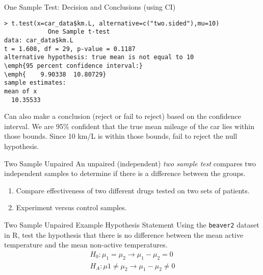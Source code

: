 \documentclass[xcolor=svgnames, 10pt, handout]{beamer}
\begin{document}
\begin{frame}[fragile]{One Sample Test: Decision and Conclusions (using CI)}\small
\begin{Verbatim}[xleftmargin=2em, xrightmargin=1.5em, frame=single, label=R code, framesep=0.5em, fontsize=\footnotesize, commandchars=\\\{\}]
> t.test(x=car_data$km.L, alternative=c("two.sided"),mu=10)
            One Sample t-test
data: car_data$km.L
t = 1.608, df = 29, p-value = 0.1187
alternative hypothesis: true mean is not equal to 10
\emph{95 percent confidence interval:}
\emph{    9.90338  10.80729}
sample estimates:
mean of x
  10.35533
\end{Verbatim}
Can also make a conclusion (reject or fail to reject) based on the confidence interval. We are 95\% confident that the true mean mileage of the car lies within those bounds. 
\vfill
Since 10 km/L is within those bounds, fail to reject the null hypothesis.
\vfill
\end{frame}


\begin{frame}[fragile]{Two Sample Unpaired}
\vfill
An unpaired (independent) \emph{two sample test} compares two independent samples to determine if there is a difference between the groups.
\vfill
\begin{example}
\begin{enumerate}
\item Compare effectiveness of two different drugs tested on two sets of patients.\\
\item Experiment versus control samples.
\end{enumerate}
\end{example}
\vfill
\end{frame}


\begin{frame}[fragile]{Two Sample Unpaired Example
Hypothesis Statement}
Using the \verb|beaver2| dataset in R, test the hypothesis that there is no difference between the mean active temperature and the mean non-active temperatures.
\begin{align*}
H_0 : \mu_1 = \mu_2 \to \mu_1 -\mu_2 = 0 \\
H_A : \mu1 \neq \mu_2 \to \mu_1 - \mu_2 \neq 0
\end{align*}
\end{frame}
\end{document}
